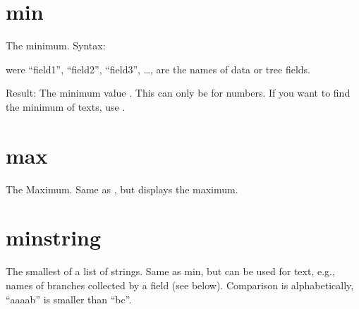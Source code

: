 \documentclass[letterpaper,10pt,english]{sphinxmanual}
\begin{document}
\section{min}
\label{\detokenize{tree-fields:min}}
\sphinxAtStartPar
The minimum.
Syntax:

\begin{sphinxVerbatim}[commandchars=\\\{\}]
 
     
     \PYG{p}{[}  \PYG{p}{]}
     \PYG{p}{[} \PYG{p}{]}
     \PYG{p}{[}\PYG{p}{]}
     \PYG{p}{[}\PYG{p}{]}
\end{sphinxVerbatim}

\sphinxAtStartPar
were “field1”, “field2”, “field3”, …, are the names of data or tree fields.

\sphinxAtStartPar
Result: The minimum value . This can only be for numbers. If you want to find the minimum of texts, use .


\section{max}
\label{\detokenize{tree-fields:max}}
\sphinxAtStartPar
The Maximum.
Same as , but displays the maximum.


\section{min\sphinxhyphen{}string}
\label{\detokenize{tree-fields:min-string}}
\sphinxAtStartPar
The smallest of a list of strings.
Same as min, but can be used for text, e.g., names of branches collected by a  field (see below). Comparison is alphabetically, “aaaab” is smaller than “bc”.
\end{document}
